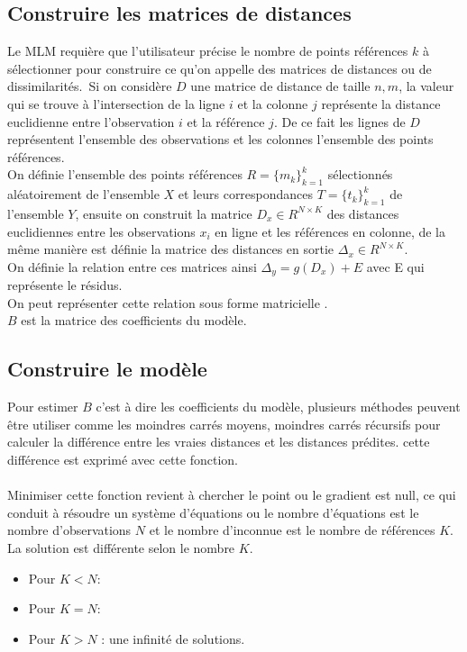 \documentclass[12pt,a4paper]{report}
\begin{document}
{\color{MidnightBlue}\subsection{Construire les matrices de distances}}
\par Le MLM requière que l'utilisateur précise le nombre de points références $k$ à sélectionner pour construire ce qu'on appelle des matrices de distances ou de dissimilarités.\
Si on considère $D$ une matrice de distance de taille $n,m$, la valeur qui se trouve à l'intersection de la ligne $i$ et la colonne $j$ représente la distance euclidienne entre l'observation $i$ et la référence $j$. De ce fait les lignes de $D$ représentent l'ensemble des observations et les colonnes l'ensemble des points références.\\
On définie l'ensemble des points références $R=\{m_k\}_{k=1}^k$ sélectionnés aléatoirement de l'ensemble $X$ et leurs correspondances $T =\{t_k\}_{k=1}^k$ de l'ensemble $Y$, ensuite on construit la matrice $D_x \in R^{N \times K}$ des distances euclidiennes entre les observations $x_i$ en ligne et les références  en colonne, de la même manière est définie la matrice des distances en sortie $\Delta_x \in R^{N \times K}$.\\
On définie la relation entre ces matrices ainsi $\Delta_y = g(D_x) + E$ avec E qui représente le résidus.\\
On peut représenter cette relation sous forme matricielle \boldmath{$\Delta_y = D_xB + E$}.\\$B$ est la matrice des coefficients du modèle.\\
{\color{MidnightBlue}\subsection{Construire le modèle}}
\par Pour estimer $B$ c'est à dire les coefficients du modèle, plusieurs méthodes peuvent être utiliser comme les moindres carrés moyens, moindres carrés récursifs pour calculer la différence entre les vraies distances et les distances prédites. cette différence est exprimé avec cette fonction.\\ \\
Minimiser cette fonction revient à chercher le point ou le gradient est null, ce qui conduit à résoudre un système d'équations ou le nombre d'équations est le nombre d'observations $N$ et le nombre d'inconnue est le nombre de références $K$. La solution est différente selon le nombre $K$.\\
\begin{itemize}
\item Pour $K < N$: 
\item Pour $K = N$: \boldmath{$\hat{B} = {D_x}^{-1} \Delta_y$}
\item Pour $K > N$ : une infinité de solutions.
\end{itemize}
\end{document}
